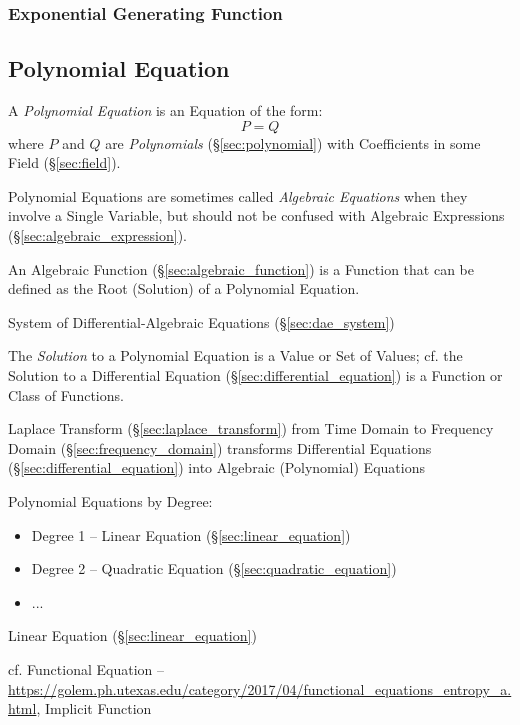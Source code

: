 \subsubsection{Exponential Generating Function}
\label{sec:exponential_generating_function}



\subsection{Polynomial Equation}\label{sec:polynomial_equation}

A \emph{Polynomial Equation} is an Equation of the form:
\[
  P = Q
\]
where $P$ and $Q$ are \emph{Polynomials} (\S\ref{sec:polynomial}) with
Coefficients in some Field (\S\ref{sec:field}).

\fist Polynomial Equations are sometimes called \emph{Algebraic Equations} when
they involve a Single Variable, but should not be confused with Algebraic
Expressions (\S\ref{sec:algebraic_expression}).

\fist An Algebraic Function (\S\ref{sec:algebraic_function}) is a Function that
can be defined as the Root (Solution) of a Polynomial Equation.

\fist System of Differential-Algebraic Equations (\S\ref{sec:dae_system})

The \emph{Solution} to a Polynomial Equation is a Value or Set of Values; cf.
the Solution to a Differential Equation (\S\ref{sec:differential_equation}) is
a Function or Class of Functions.

\fist Laplace Transform (\S\ref{sec:laplace_transform}) from Time Domain to
Frequency Domain (\S\ref{sec:frequency_domain}) transforms Differential
Equations (\S\ref{sec:differential_equation}) into Algebraic (Polynomial)
Equations

Polynomial Equations by Degree:
\begin{itemize}
  \item Degree 1 -- Linear Equation (\S\ref{sec:linear_equation})
  \item Degree 2 -- Quadratic Equation (\S\ref{sec:quadratic_equation})
  \item ...
\end{itemize}

Linear Equation (\S\ref{sec:linear_equation})

cf. Functional Equation --
\url{https://golem.ph.utexas.edu/category/2017/04/functional_equations_entropy_a.html},
Implicit Function %


